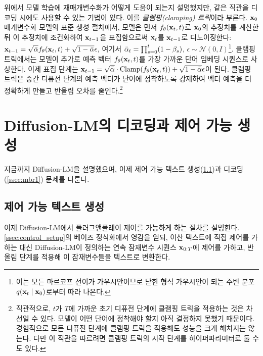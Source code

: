 위에서 모델 학습에 재매개변수화가 어떻게 도움이 되는지 설명했지만, 같은 직관을 디코딩 시에도 사용할 수 있는 기법이 있다. 이를 \emph{클램핑(clamping) 트릭}이라 부른다.
$\mathbf{x}_{0}$ 매개변수화 모델의 표준 생성 절차에서, 모델은 먼저 $f_\theta(\mathbf{x}_{t}, t)$로 $\mathbf{x}_{0}$의 추정치를 계산한 뒤 이 추정치에 조건화하여 $\mathbf{x}_{t-1}$을 표집함으로써 $\mathbf{x}_{t}$를 $\mathbf{x}_{t-1}$로 디노이징한다: $\mathbf{x}_{t-1} = \sqrt{\bar{\alpha}} f_\theta(\mathbf{x}_{t}, t) +\sqrt{1-\bar{\alpha}} \epsilon$, 여기서 $\bar{\alpha}_t = \prod_{s=0}^t (1-\beta_s)$, $\epsilon \sim \mathcal{N}(0,I)$\footnote{이는 모든 마르코프 전이가 가우시안이므로 닫힌 형식 가우시안이 되는 주변 분포 $q(\mathbf{x}_{t} \mid \mathbf{x}_{0})$로부터 따라 나온다.}. 클램핑 트릭에서는 모델이 추가로 예측 벡터 $f_\theta(\mathbf{x}_{t}, t)$를 가장 가까운 단어 임베딩 시퀀스로 사상한다. 이제 표집 단계는 $\mathbf{x}_{t-1} = \sqrt{\bar{\alpha}}\cdot \operatorname{Clamp}(f_\theta(\mathbf{x}_{t}, t)) +\sqrt{1-\bar{\alpha}} \epsilon$이 된다. 클램핑 트릭은 중간 디퓨전 단계의 예측 벡터가 단어에 정착하도록 강제하여 벡터 예측을 더 정확하게 만들고 반올림 오차를 줄인다.\footnote{직관적으로, $t$가 $T$에 가까운 초기 디퓨전 단계에 클램핑 트릭을 적용하는 것은 차선일 수 있다. 모델이 어떤 단어에 정착해야 할지 아직 결정하지 못했기 때문이다. 경험적으로 모든 디퓨전 단계에 클램핑 트릭을 적용해도 성능을 크게 해치지는 않는다. 다만 이 직관을 따르려면 클램핑 트릭의 시작 단계를 하이퍼파라미터로 둘 수도 있다.}


















\section{Diffusion-LM의 디코딩과 제어 가능 생성}
\label{sec:decode}
지금까지 Diffusion-LM을 설명했으며, 이제 제어 가능 텍스트 생성(\cref{ssec:control_text})과 디코딩(\cref{ssec:mbr1}) 문제를 다룬다.


\subsection{제어 가능 텍스트 생성}
\label{ssec:control_text}
이제 Diffusion-LM에서 플러그앤플레이 제어를 가능하게 하는 절차를 설명한다. \cref{ssec:control_setup}의 베이즈 정식화에서 영감을 얻되, 이산 텍스트에 직접 제어를 가하는 대신 Diffusion-LM이 정의하는 연속 잠재변수 시퀀스 $\mathbf{x}_{0:T}$에 제어를 가하고, 반올림 단계를 적용해 이 잠재변수들을 텍스트로 변환한다.

